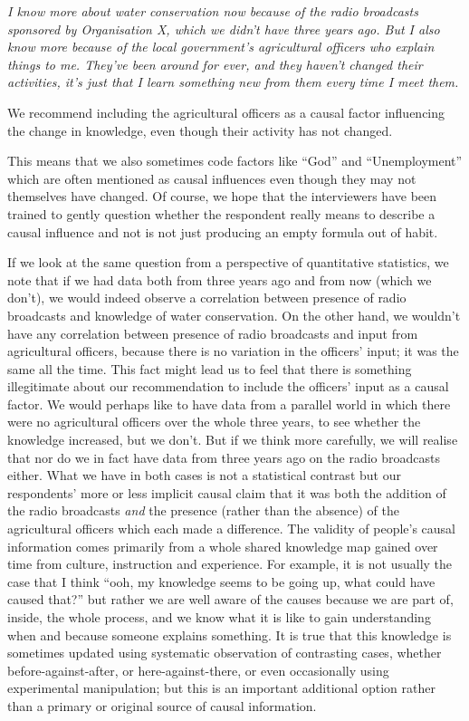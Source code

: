 \documentclass[
]{book}
\begin{document}
\emph{I know more about water conservation now because of the radio broadcasts sponsored by Organisation X, which we didn't have three years ago. But I also know more because of the local government's agricultural officers who explain things to me. They've been around for ever, and they haven't changed their activities, it's just that I learn something new from them every time I meet them.}

We recommend including the agricultural officers as a causal factor influencing the change in knowledge, even though their activity has not changed.

This means that we also sometimes code factors like ``God'' and ``Unemployment'' which are often mentioned as causal influences even though they may not themselves have changed. Of course, we hope that the interviewers have been trained to gently question whether the respondent really means to describe a causal influence and not is not just producing an empty formula out of habit.

If we look at the same question from a perspective of quantitative statistics, we note that if we had data both from three years ago and from now (which we don't), we would indeed observe a correlation between presence of radio broadcasts and knowledge of water conservation. On the other hand, we wouldn't have any correlation between presence of radio broadcasts and input from agricultural officers, because there is no variation in the officers' input; it was the same all the time. This fact might lead us to feel that there is something illegitimate about our recommendation to include the officers' input as a causal factor. We would perhaps like to have data from a parallel world in which there were no agricultural officers over the whole three years, to see whether the knowledge increased, but we don't. But if we think more carefully, we will realise that nor do we in fact have data from three years ago on the radio broadcasts either. What we have in both cases is not a statistical contrast but our respondents' more or less implicit causal claim that it was both the addition of the radio broadcasts \emph{and} the presence (rather than the absence) of the agricultural officers which each made a difference. The validity of people's causal information comes primarily from a whole shared knowledge map gained over time from culture, instruction and experience. For example, it is not usually the case that I think ``ooh, my knowledge seems to be going up, what could have caused that?'' but rather we are well aware of the causes because we are part of, inside, the whole process, and we know what it is like to gain understanding when and because someone explains something. It is true that this knowledge is sometimes updated using systematic observation of contrasting cases, whether before-against-after, or here-against-there, or even occasionally using experimental manipulation; but this is an important additional option rather than a primary or original source of causal information.
\end{document}
